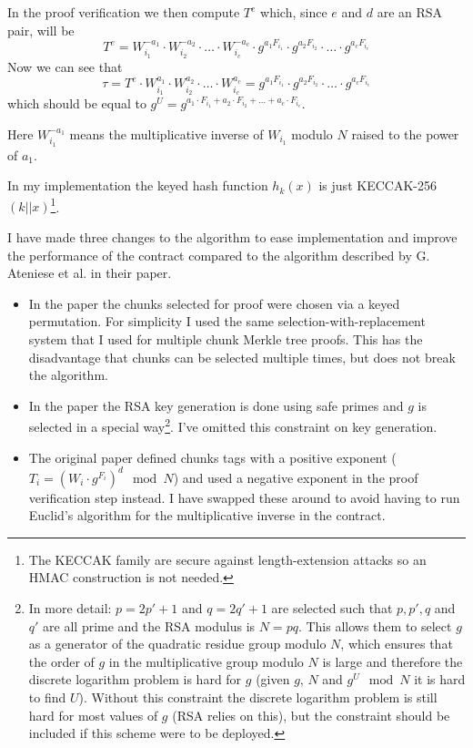 \documentclass[12pt,a4paper,twoside,openright]{report}
\begin{document}
In the proof verification we then compute $T^e$ which, since $e$ and $d$ are an RSA pair, will be
\[T^e = W_{i_1}^{-a_1} \cdot W_{i_2}^{-a_2} \cdot \ldots \cdot W_{i_c}^{-a_c} \cdot g^{a_1 F_{i_1}} \cdot g^{a_2 F_{i_2}} \cdot \ldots \cdot g^{a_c F_{i_c}}\]
Now we can see that
\[\tau = T^e \cdot W_{i_1}^{a_1} \cdot W_{i_2}^{a_2} \cdot \ldots \cdot W_{i_c}^{a_c} = g^{a_1 F_{i_1}} \cdot g^{a_2 F_{i_2}} \cdot \ldots \cdot g^{a_c F_{i_c}}\]
which should be equal to $g^U = g^{a_1 \cdot F_{i_1} + a_2 \cdot F_{i_2} + \ldots + a_c \cdot F_{i_c}}$.

Here $W_{i_1}^{-a_1}$ means the multiplicative inverse of $W_{i_1}$ modulo $N$
raised to the power of $a_1$.

In my implementation the keyed hash function $h_k(x)$ is just KECCAK-256$(k || x)$\footnote{The KECCAK family are secure against length-extension attacks
so an HMAC construction is not needed.}.


I have made three changes to the algorithm to ease implementation and improve the performance of the contract compared to the algorithm described by G. Ateniese et al.
in their paper.

\begin{itemize}
\item In the paper the chunks selected for proof were chosen via a keyed permutation.
For simplicity I used the same selection-with-replacement system that I used for multiple chunk Merkle tree proofs.
This has the disadvantage that chunks can be selected multiple times, but does not break the algorithm.

\item In the paper the RSA key generation is done using safe primes and $g$ is selected in a special way\footnote
{In more detail: $p = 2p' + 1$ and $q = 2q' + 1$ are selected
such that $p, p', q$ and $q'$ are all prime and the RSA modulus is $N = pq$.
This allows them to select $g$ as a generator of the quadratic residue group modulo $N$, which ensures
that the order of $g$ in the multiplicative group modulo $N$ is large and therefore the discrete logarithm problem is hard for $g$
(given $g$, $N$ and $g^U \mod N$ it is hard to find $U$).
Without this constraint the discrete logarithm problem is still hard for most values of $g$ (RSA relies on this), but
the constraint should be included if this scheme were to be deployed.}.
I've omitted this constraint on key generation.

\item The original paper defined chunks tags with a positive exponent ($T_i = \left(W_i \cdot g^{F_i}\right)^d \mod N$)
and used a negative exponent in the proof verification step instead.
I have swapped these around to avoid having to run Euclid's algorithm for the multiplicative inverse in the contract.
\end{itemize}
\end{document}
